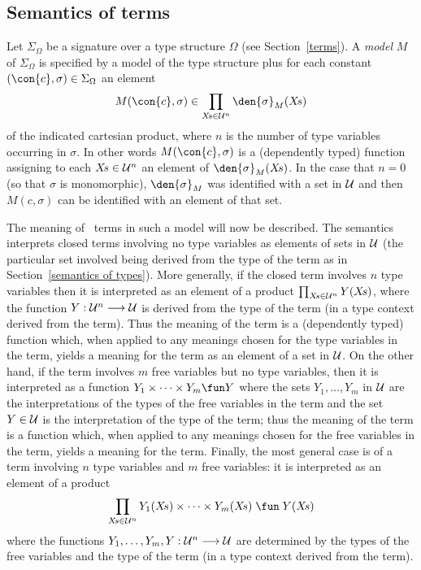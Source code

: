 \subsection{Semantics of terms}
\label{semantics of terms}

Let $\Sigma_{\Omega}$ be a signature over a type
structure $\Omega$ (see Section~\ref{terms}). A {\em model\/} $M$ of
$\Sigma_{\Omega}$ is specified by a model of the type structure plus
for each constant $(\con{c},\sigma)\in\Sigma_{\Omega}$ an
element
\[ 
M(\con{c},\sigma) \in 
\prod_{X\!s\in{\cal U}^{n}}\den{\sigma}_{M}(X\!s) 
\]
of the indicated cartesian product, where $n$ is the number of type
variables occurring in $\sigma$. In other words
$M(\con{c},\sigma)$ is a (dependently typed) function
assigning to each $X\!s\in{\cal U}^{n}$ an element of
$\den{\sigma}_{M}(X\!s)$. In the case that $n=0$ (so that
$\sigma$ is monomorphic), $\den{\sigma}_{M}$ was identified
with a set in $\cal U$ and then $M(c,\sigma)$ can be
identified with an element of that set.

The meaning of \HOL\ terms in such a model will now be described. The
semantics interprets closed terms involving no type variables as
elements of sets in $\cal U$ (the particular set involved being derived
from the type of the term as in Section~\ref{semantics of types}). More
generally, if the closed term involves $n$ type variables then it is
interpreted as an element of a product $\prod_{X\!s\in{\cal
U}^{n}}Y(X\!s)$, where the function $Y:{\cal U}^{n}\longrightarrow{\cal
U}$ is derived from the type of the term (in a type context derived
from the term). Thus the meaning of the term is a (dependently typed)
function which, when applied to any meanings chosen for the type
variables in the term, yields a meaning for the term as an element of a
set in $\cal U$. On the other hand, if the term involves $m$ free
variables but no type variables, then it is interpreted as a function
$Y_1\times\cdots\times Y_m\fun Y$ where the sets $Y_1,\ldots,Y_m$ in
$\cal U$ are the interpretations of the types of the free variables in
the term and the set $Y\in{\cal U}$ is the interpretation of the type
of the term; thus the meaning of the term is a function which, when
applied to any meanings chosen for the free variables in the term,
yields a meaning for the term. Finally, the most general case is of a
term involving $n$ type variables and $m$ free variables: it is
interpreted as an element of a product 
\[ 
\prod_{X\!s\in{\cal
U}^{n}}Y_{1}(X\!s)\times\cdots\times Y_{m}(X\!s) \;\fun\; Y(X\!s) 
\]
where the functions $Y_{1},\ldots,Y_{m},Y:{\cal
U}^{n}\longrightarrow{\cal U}$ are determined by the types of the free
variables and the type of the term (in a type context derived from the
term).

